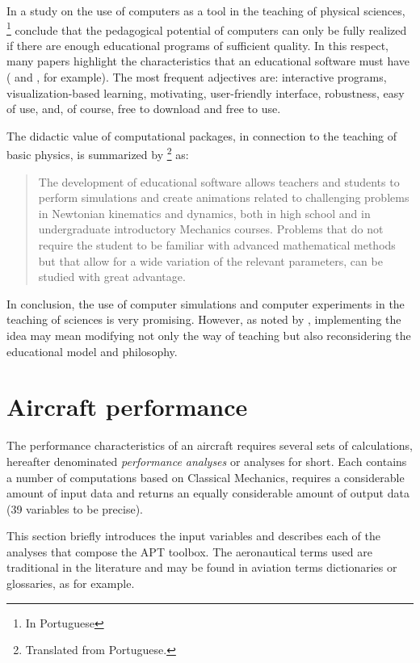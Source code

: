 \documentclass[10pt]{SelfArx} %
\begin{document}
In a  study on the use of computers as a tool in the teaching of physical sciences, \cite{mucchielle}\footnote{In Portuguese} conclude that  the pedagogical potential of computers can only be fully realized if there are enough educational programs of sufficient quality. In this respect, many papers highlight the   characteristics that an educational software must have (\cite{wideberg} and \cite{rodrigues}, for example).
The most frequent adjectives are:  interactive  programs, visualization-based learning, motivating, user-friendly interface, robustness, easy of use, and, of course, free to download and free to use.  

The didactic value of computational packages, in connection to the teaching of basic physics, is 
summarized by \cite{lopes_tort}\footnote{Translated  from Portuguese.} as: 
\begin{quote}
The development of educational software allows teachers and students to perform simulations and create animations related to  challenging problems in Newtonian kinematics and dynamics, both  in high school and in undergraduate introductory Mechanics courses. Problems that do not require the student to be familiar with advanced mathematical methods  but that allow for a wide variation of the relevant parameters, can be studied with great advantage.
\end{quote}

In conclusion, the use of  computer simulations and computer experiments in the teaching of sciences is very promising.  However, as noted by \cite{wideberg}, implementing the idea may mean  modifying not only the way of teaching but also reconsidering the educational model and philosophy.



\section{Aircraft performance}
 The performance characteristics of an aircraft requires several sets of calculations, hereafter denominated \emph{performance analyses} or {analyses} for short. Each  contains a number of computations based on Classical Mechanics, requires a considerable amount of input data and returns an equally considerable amount of output data (39 variables to be precise). 

This section briefly introduces the input variables and describes each of the analyses that compose the APT toolbox. The aeronautical terms used are traditional in the literature and may be found in aviation terms dictionaries or glossaries, as  \cite{dicionario_aviacao} for example.  
\end{document}
